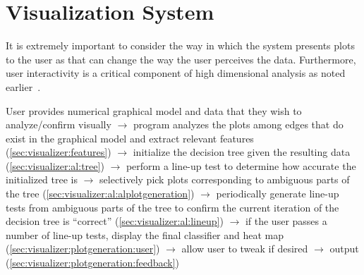 \chapter{Visualization System \label{ch:visualizer}}

It is extremely important to consider the way in which the system presents plots to the user as that can change the way the user perceives the data. Furthermore, user interactivity is a critical component of high dimensional analysis as noted earlier~\cite{lius2016}.

User provides numerical graphical model and data that they wish to analyze/confirm visually $\rightarrow$ program analyzes the plots among edges that do exist in the graphical model and extract relevant features (\ref{sec:visualizer:features}) $\rightarrow$ initialize the decision tree given the resulting data (\ref{sec:visualizer:al:tree}) $\rightarrow$ perform a line-up test to determine how accurate the initialized tree is $\rightarrow$  selectively pick plots corresponding to ambiguous parts of the tree (\ref{sec:visualizer:al:alplotgeneration}) $\rightarrow$ periodically generate line-up tests from ambiguous parts of the tree to confirm the current iteration of the decision tree is ``correct'' (\ref{sec:visualizer:al:lineup}) $\rightarrow$  if the user passes a number of line-up tests, display the final classifier and heat map (\ref{sec:visualizer:plotgeneration:user}) $\rightarrow$ allow user to tweak if desired $\rightarrow$ output (\ref{sec:visualizer:plotgeneration:feedback})




